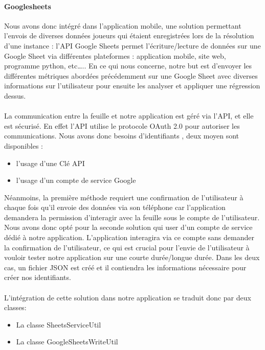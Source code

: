 \documentclass[a4paper, 10pt]{article}
\begin{document}
\paragraph{Googlesheets}
Nous avons donc intégré dans l’application mobile, une solution permettant l’envois de diverses données joueurs qui étaient enregistrées lors de la résolution d’une instance : l’API Google Sheets permet l’écriture/lecture de données sur une Google Sheet via différentes plateformes : application mobile, site web, programme python, etc….. 
En ce qui nous concerne, notre but est d’envoyer les différentes métriques abordées précédemment sur une Google Sheet avec diverses informations sur l’utilisateur pour ensuite les analyser et appliquer une régression dessus.

\paragraph{}
La communication entre la feuille et notre application est géré via l’API, et elle est sécurisé. En effet l’API utilise le protocole OAuth 2.0 pour autoriser les communications. Nous avons donc besoins d’identifiants , deux moyen sont disponibles :
 \begin{itemize}
\item l’usage d’une Clé API
\item l’usage d’un compte de service Google
\end{itemize}
Néanmoins, la première méthode requiert une confirmation de l’utilisateur à chaque fois qu’il envoie des données via son téléphone car l’application demandera la permission d'interagir avec la feuille sous le compte de l’utilisateur. Nous avons donc opté pour la seconde solution qui user d’un compte de service dédié à notre application. L’application interagira via ce compte sans demander la confirmation de l’utilisateur, ce qui est crucial pour l’envie de l’utilisateur à vouloir tester notre application sur une courte durée/longue durée.
Dans les deux cas, un fichier JSON est créé et il contiendra les informations nécessaire pour créer nos identifiants.

\paragraph{}
L’intégration de cette solution dans notre application se traduit donc par deux classes:
 \begin{itemize}
\item La classe SheetsServiceUtil
\item La classe GoogleSheetsWriteUtil
\end{itemize}
\end{document}
